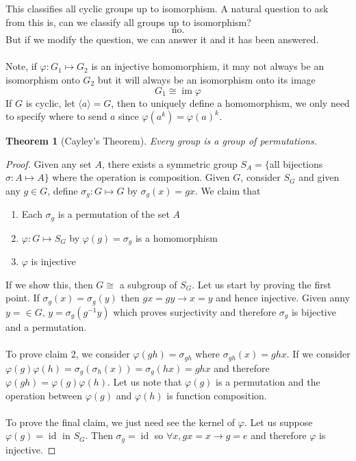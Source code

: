 \documentclass{article}
\DeclareMathOperator{\im}{im}
\DeclareMathOperator{\id}{id}
\newtheorem{theorem}{Theorem}[section]
\theoremstyle{definition}
\begin{document}
This classifies all cyclic groups up to isomorphism. A natural question to ask from this is, can we classify all groups up to isomorphism? 
\begin{equation*}
    \text{no.}
\end{equation*}
But if we modify the question, we can answer it and it has been answered. \\\\
Note, if $\varphi : G_1 \mapsto G_2$ is an injective homomorphism, it may not always be an isomorphism onto $G_2$ but it will always be an isomorphism onto its image 
\begin{equation*}
    G_1 \cong \im \varphi
\end{equation*}
If $G$ is cyclic, let $\langle a \rangle =G$, then to uniquely define a homomorphism, we only need to specify where to send $a$ since $\varphi (a^k) =\varphi (a)^k$. 
\begin{theorem}[Cayley's Theorem]
    Every group is a group of permutations.
\end{theorem}
\begin{proof}
    Given any set $A$, there exists a symmetric group $S_A=\{$all bijections $\sigma: A\mapsto A\}$ where the operation is composition. Given $G$, consider $S_G$ and given any $g \in G$, define $\sigma_g:G\mapsto G$ by $\sigma_g(x)=gx$. We claim that 
    \begin{enumerate}
        \item Each $\sigma_g$ is a permutation of the set $A$ 
        \item $\varphi:G\mapsto S_G$ by $\varphi (g)=\sigma_g$ is a homomorphism
        \item $\varphi$ is injective
    \end{enumerate}
    If we show this, then $G \cong $ a subgroup of $S_G$. Let us start by proving the first point. If $\sigma_g(x)=\sigma_g(y)$ then $gx=gy \rightarrow x=y$ and hence injective. Given anny $y=\in G$, $y=\sigma_g(g^{-1}y)$ which proves surjectivity and therefore $\sigma_g$ is bijective and a permutation. \\\\
    To prove claim 2, we consider $\varphi (gh) =\sigma_{gh}$ where $\sigma_{gh}(x)=ghx$. If we consider $\varphi(g) \varphi(h) = \sigma_g(\sigma_h(x)) = \sigma_g(hx)=ghx$ and therefore $\varphi(gh)=\varphi(g)\varphi(h)$. Let us note that $\varphi(g)$ is a permutation and the operation between $\varphi(g) $ and $\varphi(h)$ is function composition. \\\\
    To prove the final claim, we just need see the kernel of $\varphi$. Let us suppose $\varphi(g)=\id$ in $S_G$. Then $\sigma_g =\id $ so $\forall x, gx=x \to g=e$ and therefore $\varphi$ is injective.
\end{proof}
\end{document}
